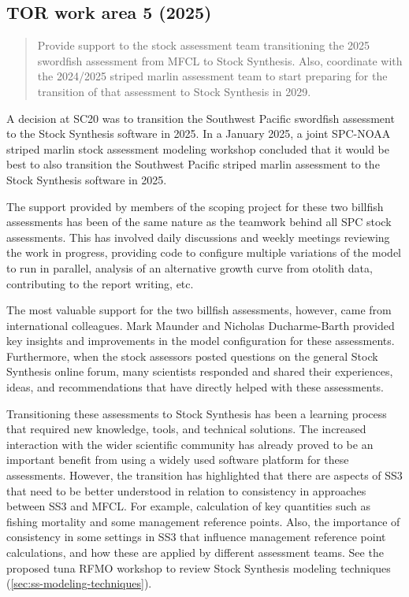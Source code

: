 \documentclass{SCreport}
\begin{document}
\hypertarget{link:tor-5}{}
\subsection{TOR work area 5 (2025)}
\label{sec:tor-5}

\begin{quote}\sf
  Provide support to the stock assessment team transitioning the 2025 swordfish
  assessment from MFCL to Stock Synthesis. Also, coordinate with the 2024/2025
  striped marlin assessment team to start preparing for the transition of that
  assessment to Stock Synthesis in 2029.
\end{quote}

\vspace{1ex}

A decision at SC20 was to transition the Southwest Pacific swordfish assessment
to the Stock Synthesis software in 2025. In a January 2025, a joint SPC-NOAA
striped marlin stock assessment modeling workshop concluded that it would be
best to also transition the Southwest Pacific striped marlin assessment to the
Stock Synthesis software in 2025.

The support provided by members of the scoping project for these two billfish
assessments has been of the same nature as the teamwork behind all SPC stock
assessments. This has involved daily discussions and weekly meetings reviewing
the work in progress, providing code to configure multiple variations of the
model to run in parallel, analysis of an alternative growth curve from otolith
data, contributing to the report writing, etc.

The most valuable support for the two billfish assessments, however, came from
international colleagues. Mark Maunder and Nicholas Ducharme-Barth provided key
insights and improvements in the model configuration for these assessments.
Furthermore, when the stock assessors posted questions on the general Stock
Synthesis online forum, many scientists responded and shared their experiences,
ideas, and recommendations that have directly helped with these assessments.

Transitioning these assessments to Stock Synthesis has been a learning process
that required new knowledge, tools, and technical solutions. The increased
interaction with the wider scientific community has already proved to be an
important benefit from using a widely used software platform for these
assessments. However, the transition has highlighted that there are aspects of
SS3 that need to be better understood in relation to consistency in approaches
between SS3 and MFCL. For example, calculation of key quantities such as fishing
mortality and some management reference points. Also, the importance of
consistency in some settings in SS3 that influence management reference point
calculations, and how these are applied by different assessment teams. See the
proposed tuna RFMO workshop to review Stock Synthesis modeling techniques
(\autoref{sec:ss-modeling-techniques}).
\end{document}
